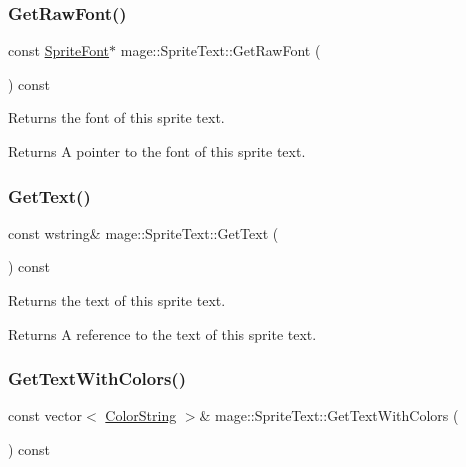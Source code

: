 \subsubsection{\texorpdfstring{Get\+Raw\+Font()}{GetRawFont()}}
{\footnotesize\ttfamily const \hyperlink{classmage_1_1_sprite_font}{Sprite\+Font}$\ast$ mage\+::\+Sprite\+Text\+::\+Get\+Raw\+Font (\begin{DoxyParamCaption}{ }\end{DoxyParamCaption}) const\hspace{0.3cm}{\ttfamily [protected]}}

Returns the font of this sprite text.

\begin{DoxyReturn}{Returns}
A pointer to the font of this sprite text. 
\end{DoxyReturn}
\hypertarget{classmage_1_1_sprite_text_a48587554bd7f6536aa95cf8dd681ebfb}{}\label{classmage_1_1_sprite_text_a48587554bd7f6536aa95cf8dd681ebfb} 
\subsubsection{\texorpdfstring{Get\+Text()}{GetText()}}
{\footnotesize\ttfamily const wstring\& mage\+::\+Sprite\+Text\+::\+Get\+Text (\begin{DoxyParamCaption}{ }\end{DoxyParamCaption}) const}

Returns the text of this sprite text.

\begin{DoxyReturn}{Returns}
A reference to the text of this sprite text. 
\end{DoxyReturn}
\hypertarget{classmage_1_1_sprite_text_a0e7be9334dcb7366c5400f2b34615b5c}{}\label{classmage_1_1_sprite_text_a0e7be9334dcb7366c5400f2b34615b5c} 
\subsubsection{\texorpdfstring{Get\+Text\+With\+Colors()}{GetTextWithColors()}}
{\footnotesize\ttfamily const vector$<$ \hyperlink{structmage_1_1_color_string}{Color\+String} $>$\& mage\+::\+Sprite\+Text\+::\+Get\+Text\+With\+Colors (\begin{DoxyParamCaption}{ }\end{DoxyParamCaption}) const}

